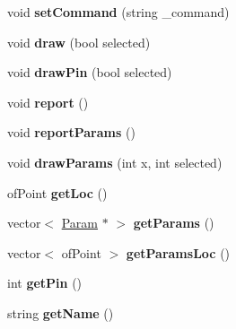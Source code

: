 \begin{DoxyCompactItemize}
\item 
\hypertarget{class_option_aa5e17ea2c140e711c9bf4f497d231756}{
void {\bfseries setCommand} (string \_\-command)}
\label{class_option_aa5e17ea2c140e711c9bf4f497d231756}

\item 
\hypertarget{class_option_a2108ee24186ed8dd467d4a74c900e72c}{
void {\bfseries draw} (bool selected)}
\label{class_option_a2108ee24186ed8dd467d4a74c900e72c}

\item 
\hypertarget{class_option_a0561a896b9465b4aeea9d4c4d382d9b7}{
void {\bfseries drawPin} (bool selected)}
\label{class_option_a0561a896b9465b4aeea9d4c4d382d9b7}

\item 
\hypertarget{class_option_ae8b2141e4b48b00925cbdd71cd473478}{
void {\bfseries report} ()}
\label{class_option_ae8b2141e4b48b00925cbdd71cd473478}

\item 
\hypertarget{class_option_a23a95cc6603d1091bb29769affbe54a3}{
void {\bfseries reportParams} ()}
\label{class_option_a23a95cc6603d1091bb29769affbe54a3}

\item 
\hypertarget{class_option_a2823ad20525baba0da0a4e13a28c80c7}{
void {\bfseries drawParams} (int x, int selected)}
\label{class_option_a2823ad20525baba0da0a4e13a28c80c7}

\item 
\hypertarget{class_option_a7d825d8dcf31121cbb63af15127cd82c}{
ofPoint {\bfseries getLoc} ()}
\label{class_option_a7d825d8dcf31121cbb63af15127cd82c}

\item 
\hypertarget{class_option_ad624979754236046c1cfe892718eb20f}{
vector$<$ \hyperlink{class_param}{Param} $\ast$ $>$ {\bfseries getParams} ()}
\label{class_option_ad624979754236046c1cfe892718eb20f}

\item 
\hypertarget{class_option_acd50a0654db53e304c9f9e366a9b6496}{
vector$<$ ofPoint $>$ {\bfseries getParamsLoc} ()}
\label{class_option_acd50a0654db53e304c9f9e366a9b6496}

\item 
\hypertarget{class_option_a400e5a1dd3d71c3d4df1d6627cb6cd8c}{
int {\bfseries getPin} ()}
\label{class_option_a400e5a1dd3d71c3d4df1d6627cb6cd8c}

\item 
\hypertarget{class_option_aa14e72aeb556ba0920626c7ad2af411f}{
string {\bfseries getName} ()}
\label{class_option_aa14e72aeb556ba0920626c7ad2af411f}


\end{DoxyCompactItemize}
